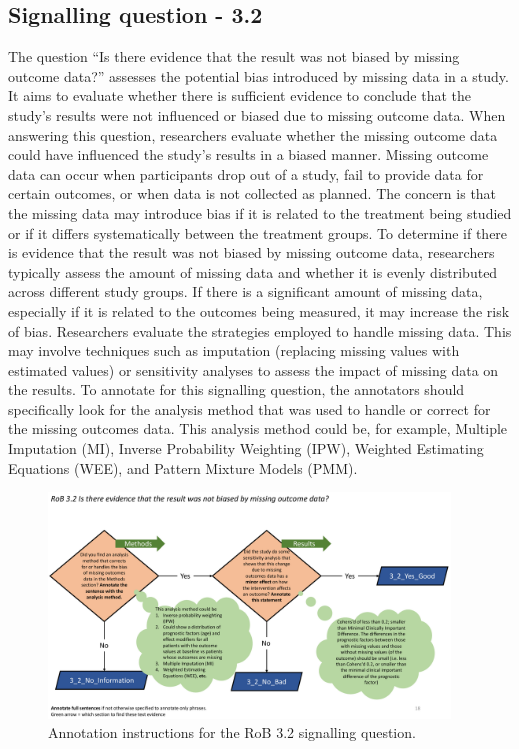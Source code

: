 \documentclass[sn-mathphys,Numbered]{sn-jnl}%
\begin{document}
\subsection*{Signalling question - 3.2 }
%
The question ``Is there evidence that the result was not biased by missing outcome data?'' assesses the potential bias introduced by missing data in a study.
It aims to evaluate whether there is sufficient evidence to conclude that the study's results were not influenced or biased due to missing outcome data.
When answering this question, researchers evaluate whether the missing outcome data could have influenced the study's results in a biased manner.
Missing outcome data can occur when participants drop out of a study, fail to provide data for certain outcomes, or when data is not collected as planned.
The concern is that the missing data may introduce bias if it is related to the treatment being studied or if it differs systematically between the treatment groups.
To determine if there is evidence that the result was not biased by missing outcome data, researchers typically assess the amount of missing data and whether it is evenly distributed across different study groups.
If there is a significant amount of missing data, especially if it is related to the outcomes being measured, it may increase the risk of bias.
Researchers evaluate the strategies employed to handle missing data.
This may involve techniques such as imputation (replacing missing values with estimated values) or sensitivity analyses to assess the impact of missing data on the results.
To annotate for this signalling question, the annotators should specifically look for the analysis method that was used to handle or correct for the missing outcomes data.
This analysis method could be, for example, Multiple Imputation (MI), Inverse Probability Weighting (IPW), Weighted Estimating Equations (WEE), and Pattern Mixture Models (PMM).


%
%
%
\begin{figure}[hbt]
    \centering
    \includegraphics[width=0.95\textwidth]{figures/3_2.pdf}
    \caption{Annotation instructions for the RoB 3.2 signalling question.}
    \label{fig:3_2}
\end{figure}
%
%
%
\end{document}
